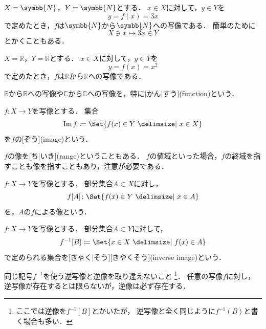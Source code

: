 \documentclass[../sotsu.tex]{subfiles}
\begin{document}
\begin{example}
    $X = \symbb{N}$，$Y = \symbb{N}$とする．
    $x \in X$に対して，$y \in Y$を
    \[ y = f(x) = 3x \]
    で定めたとき，$f$は$\symbb{N}$から$\symbb{N}$への写像である．
    簡単のために
    \[ X \ni x \longmapsto 3x \in Y \]
    とかくこともある．
\end{example}

\begin{example}
    $X = ℝ$，$Y = ℝ$とする．
    $x \in X$に対して，$y \in Y$を
    \[ y = f(x) = x^2 \]
    で定めたとき，$f$は$ℝ$から$ℝ$への写像である．

    $ℝ$から$ℝ$への写像や$ℂ$から$ℂ$への写像を，特に[かん|すう](function)という．
\end{example}

\begin{definition}[像]
    \label{dfn:image}
    $f \colon X \to Y$を写像とする．
    集合
    \begin{equation}
        \image f  \coloneq  \Set{ f(x) \in Y  \given  x \in X }
    \end{equation}
    を$f$の[ぞう](image)という．
\end{definition}

$f$の像を[ち|いき](range)ということもある．
$f$の値域といった場合，$f$の終域を指すことも像を指すこともあり，注意が必要である．

\begin{definition}[部分集合の像]
    $f \colon X \to Y$を写像とする．
    部分集合$A \subset X$に対し，
    \begin{equation}
        f[A] \colon \Set{  f(x) \in Y  \given  x \in A  }
    \end{equation}
    を，$A$の$f$による像という．
\end{definition}

\begin{definition}[逆像]
    $f \colon X \to Y$を写像とする．
    部分集合$A \subset Y$に対して，
    \begin{equation}
        f^{-1}[B] \coloneq \Set{  x \in X  \given  f(x) \in A  }
    \end{equation}
    で定められる集合を[ぎゃく|ぞう][きやくそう](inverse image)という．
\end{definition}
同じ記号$f^{-1}$を使う逆写像と逆像を取り違えないこと%
\footnote{
    ここでは逆像を$f^{-1}[B]$とかいたが，
    逆写像と全く同じように$f^{-1}(B)$と書く場合も多い．
}．
任意の写像$f$に対し，逆写像が存在するとは限らないが，逆像は必ず存在する．
\end{document}
